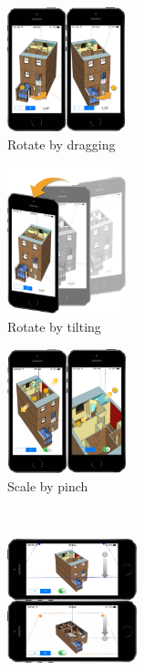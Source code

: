 \begin{figure}[b!]
    \centering
        \begin{subfigure}[b]{0.23\textwidth}
            \centering
                \includegraphics[width=\textwidth, height=3.6cm]{4-Interaction_Design/m_rotate}
                \caption{Rotate by dragging}
                \label{fig:m_rotate}
        \end{subfigure}%
        \hfill
        \begin{subfigure}[b]{0.23\textwidth}
            \centering
            \includegraphics[width=\textwidth, height=4.3cm]{4-Interaction_Design/m_rotate2}
                \caption{Rotate by tilting}
                \label{fig:m_rotate2}
        \end{subfigure}
        \hfill
        \begin{subfigure}[b]{0.23\textwidth}
            \centering
            \includegraphics[width=\textwidth, height=3.6cm]{4-Interaction_Design/m_scale}
                \caption{Scale by pinch}
                \label{fig:m_scale}
        \end{subfigure}
        \\
        \begin{subfigure}[b]{0.23\textwidth}
            \centering
                \includegraphics[width=\textwidth, height=3.6cm]{4-Interaction_Design/m_select_plane}

\end{subfigure}
\end{figure}
